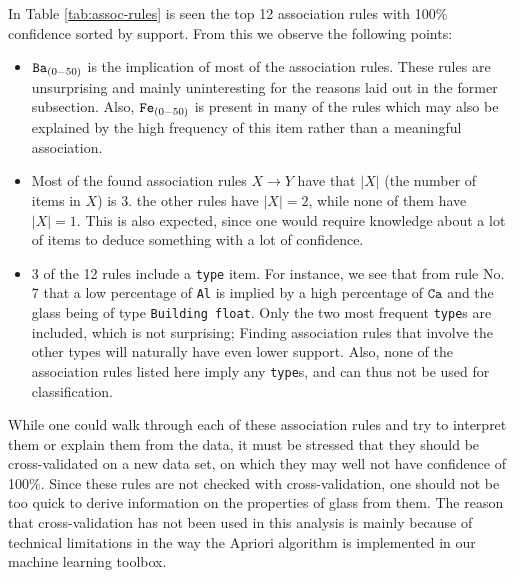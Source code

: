 In Table \ref{tab:assoc-rules} is seen the top 12 association rules with 100\% confidence sorted by support. From this we observe the following points:

\begin{itemize}
    \item $\texttt{Ba}_{(0-50)}$ is the implication of most of the association rules. These rules are unsurprising and mainly uninteresting for the reasons laid out in the former subsection. Also, $\texttt{Fe}_{(0-50)}$ is present in many of the rules which may also be explained by the high frequency of this item rather than a meaningful association.
    \item Most of the found association rules $X \rightarrow Y$ have that $|X|$ (the number of items in $X$) is 3. the other rules have $|X|=2$, while none of them have $|X|= 1$. This is also expected, since one would require knowledge about a lot of items to deduce something with a lot of confidence.
    \item 3 of the 12 rules include a \texttt{type} item. For instance, we see that from rule No. 7 that a low percentage of \texttt{Al} is implied by a high percentage of $\texttt{Ca}$ and the glass being of type \texttt{Building float}. Only the two most frequent \texttt{type}s are included, which is not surprising; Finding association rules that involve the other types will naturally have even lower support. Also, none of the association rules listed here imply any \texttt{type}s, and can thus not be used for classification.
\end{itemize}

While one could walk through each of these association rules and try to interpret them or explain them from the data, it must be stressed that they should be cross-validated on a new data set, on which they may well not have confidence of 100\%. Since these rules are not checked with cross-validation, one should not be too quick to derive information on the properties of glass from them.  The reason that cross-validation has not been used in this analysis is mainly because of technical limitations in the way the Apriori algorithm is implemented in our machine learning toolbox.